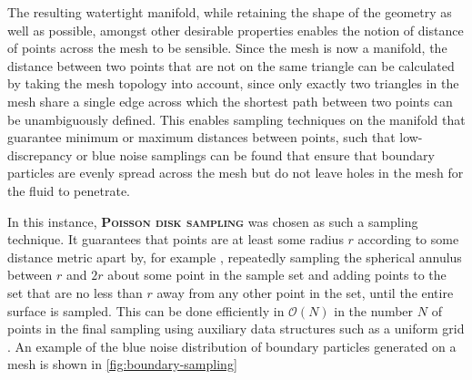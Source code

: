 \documentclass[oneside, a4paper]{book}
\newcommand\emphasis[1]{{\scshape\bfseries#1}}
\begin{document}
    The resulting watertight manifold, while retaining the shape of the geometry as well as possible, amongst other desirable properties enables the notion of distance of points across the mesh to be sensible. Since the mesh is now a manifold, the distance between two points that are not on the same triangle can be calculated by taking the mesh topology into account, since only exactly two triangles in the mesh share a single edge across which the shortest path between two points can be unambiguously defined. This enables sampling techniques on the manifold that guarantee minimum or maximum distances between points, such that low-discrepancy or blue noise samplings can be found that ensure that boundary particles are evenly spread across the mesh but do not leave holes in the mesh for the fluid to penetrate.

    In this instance, \emphasis{Poisson disk sampling} was chosen as such a sampling technique. It guarantees that points are at least some radius $r$ according to some distance metric apart by, for example \autocite{fast-poisson-disk-sampling}, repeatedly sampling the spherical annulus between $r$ and $2r$ about some point in the sample set and adding points to the set that are no less than $r$ away from any other point in the set, until the entire surface is sampled. This can be done efficiently in $\mathcal{O}(N)$ in the number $N$ of points in the final sampling using auxiliary data structures such as a uniform grid \autocite{fast-poisson-disk-sampling}. An example of the blue noise distribution of boundary particles generated on a mesh is shown in \autoref{fig:boundary-sampling}
\end{document}
